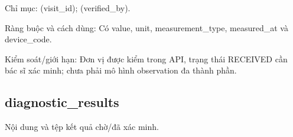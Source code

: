 Chỉ mục:\allowbreak{} (visit\_\allowbreak{}id); (verified\_\allowbreak{}by).\allowbreak{}

Ràng buộc và cách dùng:\allowbreak{} Có value, unit, measurement\_\allowbreak{}type, measured\_\allowbreak{}at và device\_\allowbreak{}code.\allowbreak{}

Kiểm soát/\allowbreak{}giới hạn:\allowbreak{} Đơn vị được kiểm trong API, trạng thái RECEIVED cần bác sĩ xác minh; chưa phải mô hình observation đa thành phần.\allowbreak{}

\clearpage

\subsection{diagnostic\_\allowbreak{}results}
Nội dung và tệp kết quả chờ/\allowbreak{}đã xác minh.\allowbreak{}


